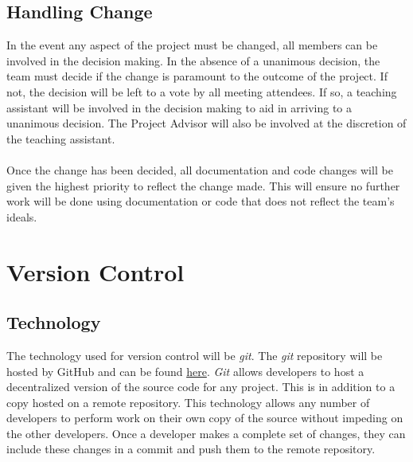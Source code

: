 \documentclass[11pt]{article}
\begin{document}
\subsection{Handling Change}
In the event any aspect of the project must be changed, all members can be involved in the decision making. In the absence of a unanimous decision, the team must decide if the change is paramount to the outcome of the project. If not, the decision will be left to a vote by all meeting attendees. If so, a teaching assistant will be involved in the decision making to aid in arriving to a unanimous decision. The Project Advisor will also be involved at the discretion of the teaching assistant. \\ \\
Once the change has been decided, all documentation and code changes will be given the highest priority to reflect the change made. This will ensure no further work will be done using documentation or code that does not reflect the team's ideals.
\section{Version Control}
\subsection{Technology}
The technology used for version control will be \textit{git}. The \textit{git} repository will be hosted by GitHub and can be found \href{https://github.com/ChristopherMcDonald/SoftwareTronCapstone}{here}. \textit{Git} allows developers to host a decentralized version of the source code for any project. This is in addition to a copy hosted on a remote repository. This technology allows any number of developers to perform work on their own copy of the source without impeding on the other developers. Once a developer makes a complete set of changes, they can include these changes in a commit and push them to the remote repository.
\end{document}
